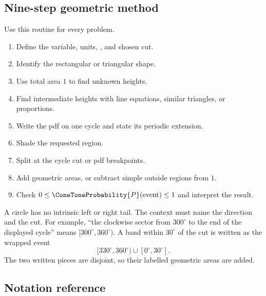 	\subsection{Nine-step geometric method}\label{sec:c3-intro-method}
	Use this routine for every problem.
	\begin{enumerate}
		\item Define the variable, units, , and chosen cut.\par
		\item Identify the rectangular or triangular shape.\par
		\item Use total area $1$ to find unknown heights.\par
		\item Find intermediate heights with line equations, similar triangles, or
		proportions.\par
		\item Write the pdf on one cycle and state its periodic extension.\par
		\item Shade the requested region.\par
		\item Split at the cycle cut or pdf breakpoints.\par
		\item Add geometric areas, or subtract simple outside regions from $1$.\par
		\item Check $0\le \ConeToneProbability{P}(\text{event})\le1$ and interpret the result.\par
	\end{enumerate}
	
	A circle has no intrinsic left or right tail.  The context must name the
	direction and the cut.  For example, ``the clockwise sector from $300^\circ$
	to the end of the displayed cycle'' means $[300^\circ,360^\circ)$.  A band
	within $30^\circ$ of the cut is written as the wrapped event
	\[
	[330^\circ,360^\circ)\cup[0^\circ,30^\circ].
	\]
	The two written pieces are disjoint, so their labelled geometric areas are
	added.
	
	\newpage
	
\subsection*{Notation reference}
\label{tone:C3:reference}
